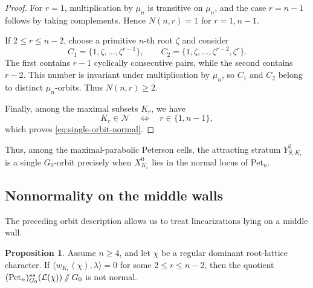 \documentclass[12pt, reqno]{amsart}
\newcommand{\sslash}{\mathbin{/\mkern-6mu/}}
\theoremstyle{plain}
\numberwithin{equation}{section}
\theoremstyle{definition}
\newtheorem{proposition}[theorem]{Proposition}
\begin{document}
\begin{proof}
For \(r=1\), multiplication by \(\mu_n\) is transitive on
\(\mu_n\), and the case \(r=n-1\) follows by taking complements.
Hence \(N(n,r)=1\) for \(r=1,n-1\).

If \(2\le r\le n-2\), choose a primitive \(n\)-th root
\(\zeta\) and consider
\[
C_1=\{1,\zeta,\ldots,\zeta^{r-1}\},
\qquad
C_2=\{1,\zeta,\ldots,\zeta^{r-2},\zeta^r\}.
\]
The first contains \(r-1\) cyclically consecutive pairs, while the
second contains \(r-2\). This number is invariant under multiplication
by \(\mu_n\), so \(C_1\) and \(C_2\) belong to distinct
\(\mu_n\)-orbits. Thus \(N(n,r)\ge2\).

Finally, among the maximal subsets \(K_r\), we have
\[
K_r\in\mathcal N
\quad\Longleftrightarrow\quad
r\in\{1,n-1\},
\]
which proves \eqref{eq:single-orbit-normal}.
\end{proof}

Thus, among the maximal-parabolic Peterson cells, the attracting
stratum \(Y^0_{S,K_r}\) is a single \(G_0\)-orbit precisely when
\(X_{K_r}^0\) lies in the normal locus of \(\mathrm{Pet}_n\).


\subsection{Nonnormality on the middle walls}

The preceding orbit description allows us to treat linearizations
lying on a middle wall.

\begin{proposition}\label{prop:middle-wall-nonnormal}
Assume \(n\ge4\), and let \(\chi\) be a regular dominant
root-lattice character. If $\langle w_{K_r}(\chi),\lambda\rangle=0$
for some \(2\le r\le n-2\), then the quotient $(\mathrm{Pet}_n)^{ss}_{G_0}(\mathcal L(\chi))
\sslash G_0$ is not normal.
\end{proposition}
\end{document}
